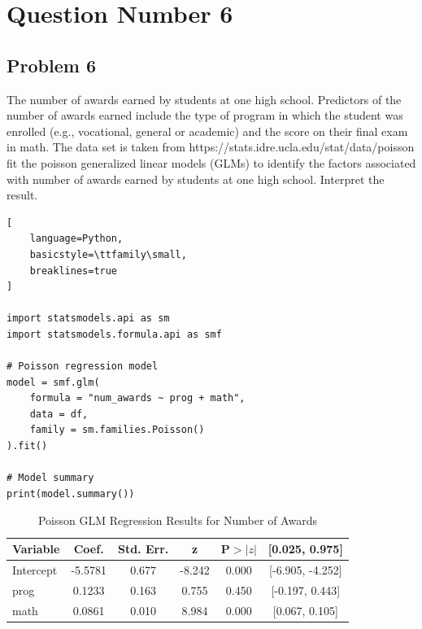 \documentclass[12pt,a4paper]{report}
\begin{document}
\chapter*{Question Number 6}
\section*{Problem 6}
The number of awards earned by students at one high school.
Predictors of the number of awards earned include the type of program in which the student was enrolled (e.g., vocational, general or academic) and the score on their final exam in math. 
The data set is taken from https://stats.idre.ucla.edu/stat/data/poisson
fit the poisson generalized linear models (GLMs) to identify the factors associated with number of awards earned by students at one high school.
Interpret the result. 
\begin{tcolorbox}[
    enhanced,
    colback=blue!3,
    colframe=blue!70!black,
    title=Poisson Regression Model,
    fonttitle=\bfseries,
    coltitle=white,
    colbacktitle=blue!70!black,
    arc=4pt,
    boxrule=1pt,
    breakable
]

\begin{lstlisting}[
    language=Python,
    basicstyle=\ttfamily\small,
    breaklines=true
]

import statsmodels.api as sm
import statsmodels.formula.api as smf

# Poisson regression model
model = smf.glm(
    formula = "num_awards ~ prog + math",
    data = df,
    family = sm.families.Poisson()
).fit()

# Model summary
print(model.summary())

\end{lstlisting}

\end{tcolorbox}
\begin{table}[h!]
\centering
\begin{tabular}{|l|c|c|c|c|c|}
\hline
\textbf{Variable} & \textbf{Coef.} & \textbf{Std. Err.} & \textbf{z} & \textbf{P$>|z|$} & \textbf{[0.025, 0.975]} \\ \hline
Intercept & -5.5781 & 0.677 & -8.242 & 0.000 & [-6.905, -4.252] \\ \hline
prog      & 0.1233  & 0.163 & 0.755  & 0.450 & [-0.197, 0.443]  \\ \hline
math      & 0.0861  & 0.010 & 8.984  & 0.000 & [0.067, 0.105]   \\ \hline
\end{tabular}
\caption{Poisson GLM Regression Results for Number of Awards}
\label{tab:glm_results}
\end{table}
\end{document}
